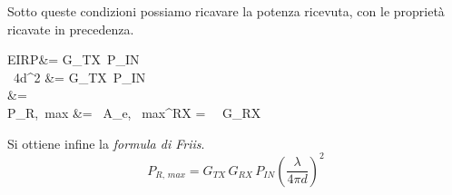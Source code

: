 Sotto queste condizioni possiamo ricavare la potenza ricevuta, con le proprietà ricavate in precedenza.
\begin{esp*}
	EIRP&= G_{TX}\, P_{IN}\\
	\, 4\pi d^2 &= G_{TX}\, P_{IN} \\
	 &= \\
	P_{R, \,max} &=  \, A_{e, \, max}^{RX} = \, \, G_{RX}
\end{esp*}

Si ottiene infine la \emph{formula di Friis}.
\begin{equation}\label{eq:friis}
	P_{R,\,max}
	= G_{TX}\, G_{RX}\, P_{IN} \left(\frac{\lambda}{4\pi d}\right)^2
\end{equation}

